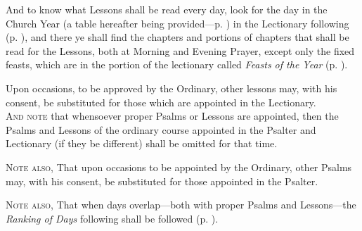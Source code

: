     And to know what Lessons shall be read every day, look for the day in the Church Year (a table hereafter being provided---p. \pageref{TableOfSeasons}) in the Lectionary following (p. \pageref{LectionarySeason}), and there ye shall find the chapters and portions of chapters that shall be read for the Lessons, both at Morning and Evening Prayer, except only the fixed feasts, which are in the portion of the lectionary called \textit{Feasts of the Year} (p. \pageref{LectionarySaints}).

    Upon occasions, to be approved by the Ordinary, other lessons may, with his consent, be substituted for those which are appointed in the Lectionary.\\

    \textsc{And note} that whensoever proper Psalms or Lessons are appointed, then the Psalms and Lessons of the ordinary course appointed in the Psalter and Lectionary (if they be different) shall be omitted for that time.

    \textsc{Note also,} That upon occasions to be appointed by the Ordinary, other Psalms may, with his consent, be substituted for those appointed in the Psalter.

    \textsc{Note also,} That when days overlap---both with proper Psalms and Lessons---the \textit{Ranking of Days} following shall be followed (p. \pageref{ranking}).

